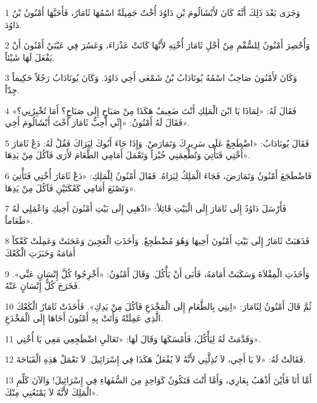 \par 1 وَجَرَى بَعْدَ ذَلِكَ أَنَّهُ كَانَ لأَبْشَالُومَ بْنِ دَاوُدَ أُخْتٌ جَمِيلَةٌ اسْمُهَا ثَامَارُ، فَأَحَبَّهَا أَمْنُونُ بْنُ دَاوُدَ.
\par 2 وَأُحْصِرَ أَمْنُونُ لِلسُّقْمِ مِنْ أَجْلِ ثَامَارَ أُخْتِهِ لأَنَّهَا كَانَتْ عَذْرَاءَ، وَعَسُرَ فِي عَيْنَيْ أَمْنُونَ أَنْ يَفْعَلَ لَهَا شَيْئاً.
\par 3 وَكَانَ لأَمْنُونَ صَاحِبٌ اسْمُهُ يُونَادَابُ بْنُ شَمْعَى أَخِي دَاوُدَ. وَكَانَ يُونَادَابُ رَجُلاً حَكِيماً جِدّاً.
\par 4 فَقَالَ لَهُ: «لِمَاذَا يَا ابْنَ الْمَلِكِ أَنْتَ ضَعِيفٌ هَكَذَا مِنْ صَبَاحٍ إِلَى صَبَاحٍ؟ أَمَا تُخْبِرُنِي؟» فَقَالَ لَهُ أَمْنُونُ: «إِنِّي أُحِبُّ ثَامَارَ أُخْتَ أَبْشَالُومَ أَخِي».
\par 5 فَقَالَ يُونَادَابُ: «اضْطَجِعْ عَلَى سَرِيرِكَ وَتَمَارَضْ. وَإِذَا جَاءَ أَبُوكَ لِيَرَاكَ فَقُلْ لَهُ: دَعْ ثَامَارَ أُخْتِي فَتَأْتِيَ وَتُطْعِمَنِي خُبْزاً وَتَعْمَلَ أَمَامِي الطَّعَامَ لأَرَى فَآكُلَ مِنْ يَدِهَا».
\par 6 فَاضْطَجَعَ أَمْنُونُ وَتَمَارَضَ، فَجَاءَ الْمَلِكُ لِيَرَاهُ. فَقَالَ أَمْنُونُ لِلْمَلِكِ: «دَعْ ثَامَارَ أُخْتِي فَتَأْتِيَ وَتَصْنَعَ أَمَامِي كَعْكَتَيْنِ فَآكُلَ مِنْ يَدِهَا».
\par 7 فَأَرْسَلَ دَاوُدُ إِلَى ثَامَارَ إِلَى الْبَيْتِ قَائِلاً: «اذْهَبِي إِلَى بَيْتِ أَمْنُونَ أَخِيكِ وَاعْمَلِي لَهُ طَعَاماً».
\par 8 فَذَهَبَتْ ثَامَارُ إِلَى بَيْتِ أَمْنُونَ أَخِيهَا وَهُوَ مُضْطَجِعٌ. وَأَخَذَتِ الْعَجِينَ وَعَجَنَتْ وَعَمِلَتْ كَعْكاً أَمَامَهُ وَخَبَزَتِ الْكَعْكَ
\par 9 وَأَخَذَتِ الْمِقْلاَةَ وَسَكَبَتْ أَمَامَهُ، فَأَبَى أَنْ يَأْكُلَ. وَقَالَ أَمْنُونُ: «أَخْرِجُوا كُلَّ إِنْسَانٍ عَنِّي». فَخَرَجَ كُلُّ إِنْسَانٍ عَنْهُ.
\par 10 ثُمَّ قَالَ أَمْنُونُ لِثَامَارَ: «اِيتِي بِالطَّعَامِ إِلَى الْمَخْدَعِ فَآكُلَ مِنْ يَدِكِ». فَأَخَذَتْ ثَامَارُ الْكَعْكَ الَّذِي عَمِلَتْهُ وَأَتَتْ بِهِ أَمْنُونَ أَخَاهَا إِلَى الْمَخْدَعِ.
\par 11 وَقَدَّمَتْ لَهُ لِيَأْكُلَ، فَأَمْسَكَهَا وَقَالَ لَهَا: «تَعَالَيِ اضْطَجِعِي مَعِي يَا أُخْتِي».
\par 12 فَقَالَتْ لَهُ: «لاَ يَا أَخِي، لاَ تُذِلَّنِي لأَنَّهُ لاَ يُفْعَلُ هَكَذَا فِي إِسْرَائِيلَ. لاَ تَعْمَلْ هَذِهِ الْقَبَاحَةَ.
\par 13 أَمَّا أَنَا فَأَيْنَ أَذْهَبُ بِعَارِي، وَأَمَّا أَنْتَ فَتَكُونُ كَوَاحِدٍ مِنَ السُّفَهَاءِ فِي إِسْرَائِيلَ! وَالآنَ كَلِّمِ الْمَلِكَ لأَنَّهُ لاَ يَمْنَعُنِي مِنْكَ».
